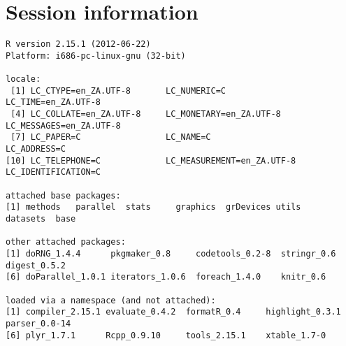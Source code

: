 \documentclass[a4paper,12pt]{article}\usepackage{graphicx, color}
\makeatletter
\newenvironment{kframe}{%
 \def\FrameCommand##1{\hskip\@totalleftmargin \hskip-\fboxsep
 \colorbox{shadecolor}{##1}\hskip-\fboxsep
     \hskip-\linewidth \hskip-\@totalleftmargin \hskip\columnwidth}%
 \MakeFramed {\advance\hsize-\width
   \@totalleftmargin\z@ \linewidth\hsize
   \@setminipage}}%
 {\par\unskip\endMakeFramed}
\newenvironment{knitrout}{}{} %
\renewenvironment{knitrout}{\begin{footnotesize}}{\end{footnotesize}}
\makeatother
\begin{document}
\section*{Session information}
\begin{knitrout}
\color{fgcolor}\begin{kframe}
\begin{verbatim}
R version 2.15.1 (2012-06-22)
Platform: i686-pc-linux-gnu (32-bit)

locale:
 [1] LC_CTYPE=en_ZA.UTF-8       LC_NUMERIC=C               LC_TIME=en_ZA.UTF-8       
 [4] LC_COLLATE=en_ZA.UTF-8     LC_MONETARY=en_ZA.UTF-8    LC_MESSAGES=en_ZA.UTF-8   
 [7] LC_PAPER=C                 LC_NAME=C                  LC_ADDRESS=C              
[10] LC_TELEPHONE=C             LC_MEASUREMENT=en_ZA.UTF-8 LC_IDENTIFICATION=C       

attached base packages:
[1] methods   parallel  stats     graphics  grDevices utils     datasets  base     

other attached packages:
[1] doRNG_1.4.4      pkgmaker_0.8     codetools_0.2-8  stringr_0.6      digest_0.5.2    
[6] doParallel_1.0.1 iterators_1.0.6  foreach_1.4.0    knitr_0.6       

loaded via a namespace (and not attached):
[1] compiler_2.15.1 evaluate_0.4.2  formatR_0.4     highlight_0.3.1 parser_0.0-14  
[6] plyr_1.7.1      Rcpp_0.9.10     tools_2.15.1    xtable_1.7-0   
\end{verbatim}
\end{kframe}
\end{knitrout}


\printbibliography[heading=bibintoc]
\end{document}
